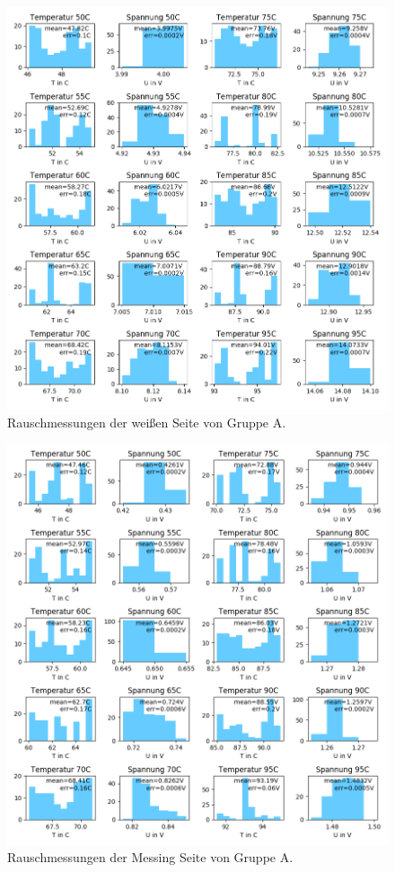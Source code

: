 \documentclass[12pt,a4paper]{article}
\begin{document}
\begin{figure}[H]
\includegraphics[scale=0.8]{Bilder/Rauschen_A_weiss_2.png}
\caption{Rauschmessungen der weißen Seite von Gruppe A.}
\end{figure}

\begin{figure}[H]
\includegraphics[scale=0.8]{Bilder/Rauschen_A_messing_2.png}
\caption{Rauschmessungen der Messing Seite von Gruppe A.}
\end{figure}
\end{document}
